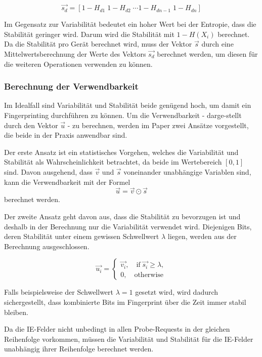 \begin{equation}
    \label{equation:stability}
    \vec{s_{d}} = [1-H_{d1}\; 1-H_{d2}\; \cdots 1-H_{dn-1}\; 1-H_{dn}]
\end{equation}

\clearpage

Im Gegensatz zur Variabilität bedeutet ein hoher Wert bei der Entropie,
dass die Stabilität geringer wird. 
Darum wird die Stabilität mit $1-H(X_{i})$ berechnet.
Da die Stabilität pro Gerät berechnet wird, muss der Vektor $\vec{s}$
durch eine Mittelwertsberechnung der Werte des Vektors $\vec{s_{d}}$
berechnet werden, um diesen für die weiteren Operationen verwenden zu können.

\subsubsection*{Berechnung der Verwendbarkeit}
Im Idealfall sind Variabilität und Stabilität beide genügend hoch, 
um damit ein Fingerprinting durchführen zu können. 
Um die Verwendbarkeit - darge-stellt durch den Vektor $\vec{u}$ - zu berechnen,
werden im Paper zwei Ansätze vorgestellt, die beide in der Praxis anwendbar
sind. 

Der erste Ansatz ist ein statistisches Vorgehen, welches die Variabilität
und Stabilität als Wahrscheinlichkeit betrachtet, da beide im Wertebereich
$[0, 1]$ sind. Davon ausgehend, dass $\vec{v} \text{ und } \vec{s}$ 
voneinander unabhängige Variablen sind, kann die Verwendbarkeit mit der
Formel
\begin{equation}
    \vec{u} = \vec{v} \odot \vec{s}
\end{equation}
berechnet werden.

Der zweite Ansatz geht davon aus, dass die Stabilität zu bevorzugen ist
und deshalb in der Berechnung nur die Variabilität verwendet wird.
Diejenigen Bits, deren Stabilität unter einem gewissen Schwellwert $\lambda$ 
liegen, werden aus der Berechnung ausgeschlossen.

\begin{equation}
    \vec{u_{i}} = 
    \begin{cases}
        \vec{v_{i}},\quad \text{if}\; \vec{s_{i}} \geq \lambda, \\
        0,\quad \text{otherwise}
    \end{cases}
\end{equation}

Falls beispielsweise der Schwellwert $\lambda = 1$ gesetzt wird, 
wird dadurch sichergestellt, dass kombinierte Bits im Fingerprint über die 
Zeit immer stabil bleiben.

Da die IE-Felder nicht unbedingt in allen Probe-Requests in der gleichen 
Reihenfolge vorkommen, müssen die Variabilität und Stabilität für 
die IE-Felder unabhängig ihrer Reihenfolge berechnet werden.

\clearpage